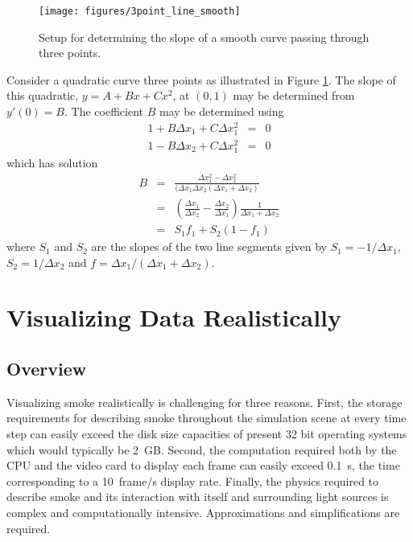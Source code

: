 \documentclass[11pt,twoside]{book}
\newcommand{\figoptions}{htp}
\begin{document}
\begin{figure}[\figoptions]
\begin{center}
\texttt{[image: figures/3point\_line\_smooth]}
\end{center}
\caption{Setup for determining the slope of a smooth curve passing through three points.}
\label{figlinesmooth}%
\end{figure}
Consider a quadratic curve three points as illustrated in Figure \ref{figlinesmooth}.  The slope of this quadratic, $y=A+Bx+Cx^2$, at $(0,1)$ may be determined from $y'(0)=B$.  The coefficient $B$ may be determined using
\begin{eqnarray*}
1+B\Delta x_1 + C \Delta x_1^2 &= &0\\
1-B\Delta x_2 + C \Delta x_1^2 &= &0
\end{eqnarray*}
which has solution
\begin{eqnarray*}
B&=&\frac{\Delta x_1^2-\Delta x_2^2}{(\Delta x_1\Delta x_2(\Delta x_1+\Delta x_2)}\\
&=&(\frac{\Delta x_1}{\Delta x_2}-\frac{\Delta x_2}{\Delta x_1})\frac{1}{\Delta x_1+\Delta x_2}\\
&=&S_1f_1+S_2(1-f_1)
\end{eqnarray*}
where $S_1$ and $S_2$ are the slopes of the two line segments given by $S_1=-1/\Delta x_1$,
$S_2=1/\Delta x_2$ and $f=\Delta x_1/(\Delta x_1+\Delta x_2)$.


\part{Visualizing Data Realistically}

%
%

\chapter{Overview}
Visualizing smoke realistically is challenging for three reasons.
First, the storage requirements for describing smoke throughout the
simulation scene at every time step can easily exceed the disk
size capacities of present 32 bit operating systems which would
typically be 2~GB. Second, the computation required both by the CPU and
the video card to display each frame can easily exceed 0.1~s, the
time corresponding to a 10~frame/s display rate. Finally, the physics
required to describe smoke and its interaction with itself and
surrounding light sources is complex and computationally
intensive. Approximations and simplifications are required.
\end{document}
